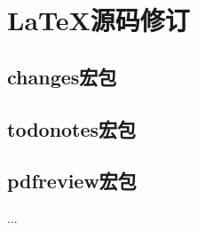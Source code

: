 \documentclass[fontset = none, t, aspectratio=169]{ctexbeamer}
\begin{document}
\section{\LaTeX 源码修订}
\subsection{changes宏包}
\subsection{todonotes宏包}
\subsection{pdfreview宏包}

\begin{frame}
  ...
\end{frame}
\end{document}
